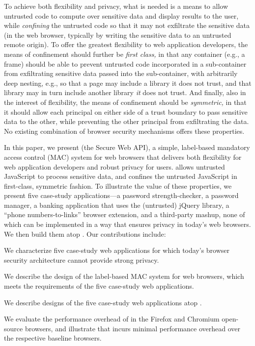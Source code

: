 To achieve both flexibility and privacy, what is needed is a means to
allow untrusted code to compute over sensitive data and display
results to  the user, while {\em confining} the untrusted code so that
it may not exfiltrate the sensitive data (in the web browser,
typically by writing the sensitive data to an untrusted remote
origin). To offer the greatest flexibility to web application
developers, the means of confinement should further be {\em first
  class,} in that any container (e.g., a frame) should be able
to prevent untrusted code incorporated in a sub-container from
exfiltrating sensitive data passed into the sub-container, with
arbitrarily deep nesting, e.g., so that a page may include a
library it does not trust, and that library may in turn include
another library {\em it} does not trust. And finally, also in the
interest of flexibility, the means of confinement should be {\em
  symmetric,} in that it should allow each principal on either side of
a trust boundary to pass sensitive data to the other, while preventing
the other principal from exfiltrating the data. No existing
combination of browser security mechanisms offers these properties.

In this paper, we present \sys{} (the Secure Web API), a simple,
label-based mandatory access control (MAC) system for web browsers
that delivers both flexibility for web application developers and
robust privacy for users. \sys{} allows untrusted JavaScript to
process sensitive data, and confines the untrusted JavaScript in
first-class, symmetric fashion.  To illustrate the value of these
properties, we present five case-study applications---a password
strength-checker, a password manager, a banking application that uses
the (untrusted) jQuery library, a ``phone numbers-to-links'' browser
extension, and a third-party mashup, none of which can be implemented
in a way that ensures privacy in today's web browsers.  We then build
them atop \sys. Our contributions include:

\begin{CompactItemize}
\item We characterize five case-study web applications for which
  today's browser security architecture cannot provide strong privacy.
\item We describe the design of the \sys{} label-based MAC system
  for web browsers, which meets the requirements of the five
  case-study web applications.
\item We describe designs of the five case-study web applications atop
  \sys.
\item We evaluate the performance overhead of \sys{} in the Firefox
  and Chromium open-source browsers, and illustrate that \sys{}
  incurs minimal performance overhead over the respective baseline
  browsers.
\end{CompactItemize}

